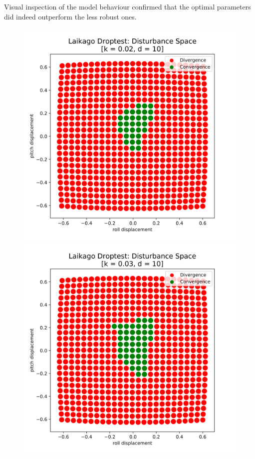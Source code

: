     Visual inspection of the model behaviour confirmed that the optimal parameters did indeed outperform the less robust ones. 



    \begin{figure}[h]
        \centering
        \begin{minipage}{0.33\textwidth}
            \centering
            \includegraphics[width=\textwidth]{figures/droptest_ds_bad_v4.png} %
        \end{minipage}\hfill
        \begin{minipage}{0.33\textwidth}
            \centering
            \includegraphics[width=\textwidth]{figures/droptest_ds_medium_v4.png} %

\end{minipage}
\end{figure}
